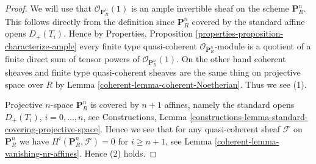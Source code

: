\begin{proof}

We will use that $\mathcal{O}_{\mathbf{P}^n_R}(1)$ is an ample invertible
sheaf on
the scheme $\mathbf{P}^n_R$. This follows directly from the definition
since $\mathbf{P}^n_R$ covered by the standard affine opens $D_{+}(T_i)$.
Hence by
Properties, Proposition \ref{properties-proposition-characterize-ample}
every finite type quasi-coherent $\mathcal{O}_{\mathbf{P}^n_R}$-module
is a quotient of a finite direct sum of tensor powers of
$\mathcal{O}_{\mathbf{P}^n_R}(1)$. On the other hand coherent sheaves
and finite type quasi-coherent sheaves are the same thing on projective
space over $R$ by Lemma \ref{coherent-lemma-coherent-Noetherian}. Thus we see (1).

\medskip\noindent
Projective $n$-space $\mathbf{P}^n_R$ is covered by $n + 1$ affines,
namely the standard opens $D_{+}(T_i)$, $i = 0, \ldots, n$, see Constructions,
Lemma \ref{constructions-lemma-standard-covering-projective-space}.
Hence we see that for any quasi-coherent
sheaf $\mathcal{F}$ on $\mathbf{P}^n_R$
we have $H^i(\mathbf{P}^n_R, \mathcal{F}) = 0$ for $i \geq n + 1$,
see Lemma \ref{coherent-lemma-vanishing-nr-affines}. Hence (2) holds.


\end{proof}
